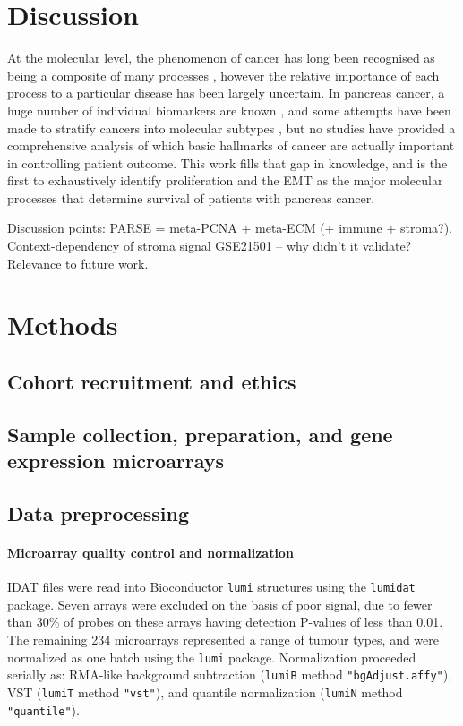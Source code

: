 \documentclass[dissertation.tex]{subfiles}
\begin{document}

\section{Discussion}

At the molecular level, the phenomenon of cancer has long been recognised as being a composite of many processes \cite{Hanahan2011}, however the relative importance of each process to a particular disease has been largely uncertain.  In pancreas cancer, a huge number of individual biomarkers are known \cite{Harsha2009}, and some attempts have been made to stratify cancers into molecular subtypes \cite{Collisson2011}, but no studies have provided a comprehensive analysis of which basic hallmarks of cancer are actually important in controlling patient outcome.  This work fills that gap in knowledge, and is the first to exhaustively identify proliferation and the \gls{EMT} as the major molecular processes that determine survival of patients with pancreas cancer.

Discussion points:
  PARSE = meta-PCNA + meta-ECM (+ immune + stroma?).
  Context-dependency of stroma signal
  GSE21501 -- why didn't it validate?
  Relevance to future work.

\section{Methods}
\subsection{Cohort recruitment and ethics}

\subsection{Sample collection, preparation, and gene expression microarrays}

\subsection{Data preprocessing}
\paragraph{Microarray quality control and normalization}
\gls{IDAT} files were read into Bioconductor \texttt{lumi} structures using the \texttt{lumidat} package.  Seven arrays were excluded on the basis of poor signal, due to fewer than 30\% of probes on these arrays having detection P-values of less than 0.01.  The remaining 234 microarrays represented a range of tumour types, and were normalized as one batch using the \texttt{lumi} package.  Normalization proceeded serially as: RMA-like background subtraction (\texttt{lumiB} method \texttt{"bgAdjust.affy"}), \gls{VST} (\texttt{lumiT} method \texttt{"vst"}), and quantile normalization (\texttt{lumiN} method \texttt{"quantile"}).
\end{document}
